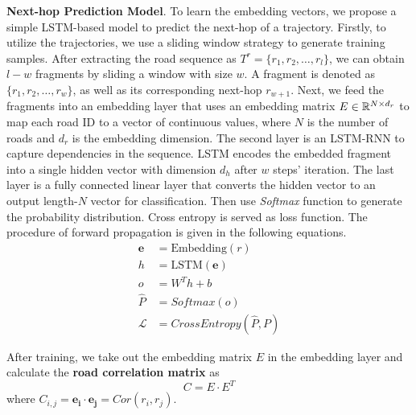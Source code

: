 \textbf{Next-hop Prediction Model}. To learn the embedding vectors, we propose a simple LSTM\cite{LSTM}-based model to predict the next-hop of a trajectory. Firstly, to utilize the trajectories, we use a sliding window strategy to generate training samples. After extracting the road sequence as $T^r=\{r_1, r_2, \dots, r_l \}$, we can obtain $l-w$ fragments by sliding a window with size $w$. A fragment is denoted as $\{r_1, r_2, \dots, r_w\}$, as well as its corresponding next-hop $r_{w+1}$. Next, we feed the fragments into an embedding layer that uses an embedding matrix $E\in\mathbb{R}^{N\times d_r}$ to map each road ID to a vector of continuous values, where $N$ is the number of roads and $d_r$ is the embedding dimension. The second layer is an LSTM-RNN to capture dependencies in the sequence. LSTM encodes the embedded fragment into a single hidden vector with dimension $d_h$ after $w$ steps' iteration. The last layer is a fully connected linear layer that converts the hidden vector to an output length-$N$ vector for classification. Then use \textit{Softmax} function to generate the probability distribution. Cross entropy is served as loss function. The procedure of forward propagation is given in the following equations.
\begin{equation}
    \begin{aligned}
        \mathbf{e}&=\mathrm{Embedding}(r)\\
        h&=\mathrm{LSTM}(\mathbf{e})\\
        o&=W^Th+b\\
        \hat P&=Softmax(o)\\
        \mathcal{L}&=CrossEntropy(\hat P, P)
    \end{aligned}
\end{equation}

After training, we take out the embedding matrix $E$ in the embedding layer and calculate the \textbf{road correlation matrix} as
\begin{equation}
    C=E\cdot E^T
\end{equation}
where $C_{i, j}=\mathbf{e_i}\cdot \mathbf{e_j}=Cor(r_i, r_j)$.

